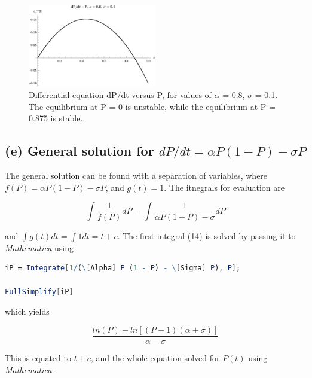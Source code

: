 \begin{figure}
\centering
\includegraphics[width=0.5\textwidth,height=\textheight]{figChap6.8d.eps}
\caption{Differential equation dP/dt versus P, for values of \(\alpha\)
= 0.8, \(\sigma\) = 0.1. The equilibrium at P = 0 is unstable, while the
equilibrium at P = 0.875 is stable.}
\end{figure}

\hypertarget{e-general-solution-for-dpdt-alpha-p-1-p---sigma-p}{%
\subsection{\texorpdfstring{(e) General solution for
\(dP/dt = \alpha P (1-P) - \sigma P\)}{(e) General solution for dP/dt = \textbackslash{}alpha P (1-P) - \textbackslash{}sigma P}}\label{e-general-solution-for-dpdt-alpha-p-1-p---sigma-p}}

The general solution can be found with a separation of variables, where
\(f(P) = \alpha P (1-P) - \sigma P\), and \(g(t) = 1\). The itnegrals
for evaluation are

\begin{equation} \int \frac{1}{f(P)} dP = \int \frac{1}{\alpha P (1-P) - \sigma} dP \end{equation}

and \(\int g(t)dt = \int 1 dt = t + c\). The first integral (14) is
solved by passing it to \emph{Mathematica} using

\begin{lstlisting}[language=Mathematica]
iP = Integrate[1/(\[Alpha] P (1 - P) - \[Sigma] P), P];

FullSimplify[iP]

\end{lstlisting}

which yields

\begin{equation} \frac{ln(P) - ln[(P - 1)(\alpha + \sigma)]}{\alpha - \sigma} \end{equation}

This is equated to \(t + c\), and the whole equation solved for \(P(t)\)
using \emph{Mathematica}:

